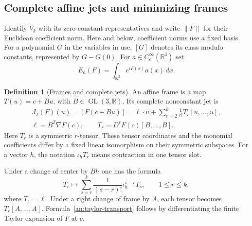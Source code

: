 \documentclass[11pt]{amsart}
\theoremstyle{definition}
\newtheorem{definition}{Definition}[section]
\theoremstyle{remark}
\numberwithin{equation}{section}
\begin{document}
\subsection{Complete affine jets and minimizing frames}\label{an:coefficient-changes}\label{an:jets}\label{an:normalization}

Identify $V_k$ with its zero-constant representatives and write $\|F\|$ for their Euclidean coefficient norm. Here and below, coefficient norms use a fixed basis. For a polynomial $G$ in the variables in use, $[G]$ denotes its class modulo constants, represented by $G-G(0)$. For $a\in C_c^\infty(\mathbb R^3)$ set
\[
E_a(F)=\int_{\mathbb R^3}e^{iF(x)}a(x)\,dx.
\]

\begin{definition}[Frames and complete jets]\label{def:complete-jet}
An affine frame is a map $T(u)=c+Bu$, with $B\in\operatorname{GL}(3,\mathbb R)$. Its complete nonconstant jet is
\[
\begin{gathered}
J_T(F)(u)=[F(c+Bu)]=\ell\cdot u+\sum_{r=2}^k\frac1{r!}T_r[u,\ldots,u],\\
\ell=B^T\nabla F(c),\qquad T_r=D^rF(c)[B,\ldots,B].
\end{gathered}
\]
Here $T_r$ is a symmetric $r$-tensor. These tensor coordinates and the monomial coefficients differ by a fixed linear isomorphism on their symmetric subspaces. For a vector $h$, the notation $\iota_hT_r$ means contraction in one tensor slot.
\end{definition}

Under a change of center by $Bh$ one has the formula
\begin{equation}\label{an:taylor-transport}
T_r\longmapsto\sum_{s=r}^k\frac1{(s-r)!}\iota_h^{s-r}T_s,\qquad 1\le r\le k,
\end{equation}
where $T_1=\ell$. Under a right change of frame by $A$, each tensor becomes $T_r[A,\ldots,A]$. Formula~\eqref{an:taylor-transport} follows by differentiating the finite Taylor expansion of $F$ at $c$.
\end{document}
